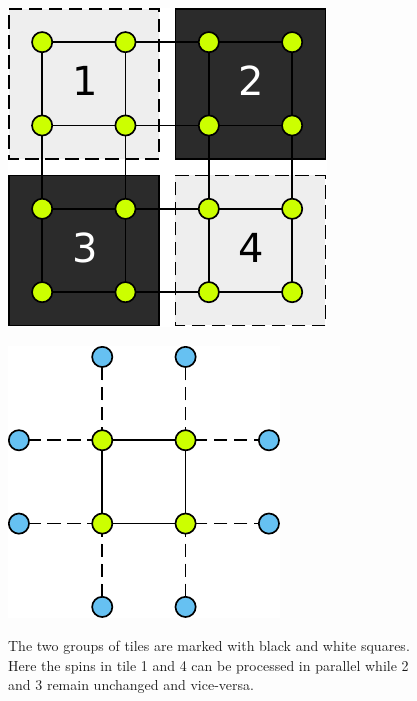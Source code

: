\documentclass[paper=a4, fontsize=11pt]{scrartcl} %
\numberwithin{equation}{section} %
\numberwithin{figure}{section} %
\numberwithin{table}{section} %
\begin{document}
\begin{figure}
\centering
\begin{minipage}{.60\textwidth}
  \centering
  \includegraphics[width=.5\linewidth]{images/4x4.pdf}
  \caption{The two groups of tiles are marked with black and white squares. Here the spins in tile 1 and 4 can be processed in parallel while 2 and 3 remain unchanged and vice-versa.}
  \label{fig:checker_grid}
\end{minipage}
\hspace{0.05\linewidth}
\begin{minipage}{.3\textwidth}
  \centering
  \includegraphics[width=0.9\linewidth]{images/2D_ghosts.pdf}
  \label{fig:gost_cells}
\end{minipage}
\end{figure}
\end{document}
